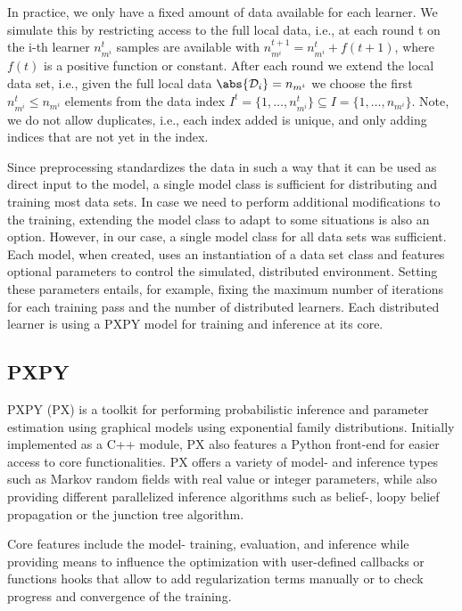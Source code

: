 In practice, we only have a fixed amount of data available for each learner.
We simulate this by restricting access to the full local data, i.e., at each round t on the i-th learner  $n^{t}_{m^i}$ samples are available with $n^{t+1}_{m^i} = n^{t}_{m^i} + f(t+1)$, where $f(t)$ is a positive function or constant.
After each round we extend the local data set, i.e., given the full local data $\abs{\mathcal{D}_i} = n_{m^i}$  we choose the first  $ n^{t}_{m^i} \leq n_{m^i}$ elements from the data index $I^t =\{1, \ldots, n^{t}_{m^i}\} \subseteq I = \{1, \ldots, n_{m^i}\}$. 
Note, we do not allow duplicates, i.e., each index added is unique, and only adding indices that are not yet in the index.



Since preprocessing standardizes the data in such a way that it can be used as direct input to the model, a single model class is sufficient for distributing and training most data sets.
In case we need to perform additional modifications to the training, extending the model class to adapt to some situations is also an option.
However, in our case, a single model class for all data sets was sufficient.
Each model, when created, uses an instantiation of a data set class and features optional parameters to control the simulated, distributed environment. 
Setting these parameters entails, for example, fixing the maximum number of iterations for each training pass and the number of distributed learners.
Each distributed learner is using a PXPY model for training and inference at its core.

\subsection{PXPY}
PXPY\cite{piatkowski2018exponential} (PX) is a toolkit for performing probabilistic inference and parameter estimation using graphical models using exponential family distributions.
Initially implemented as a C++ module, PX also features a Python front-end for easier access to core functionalities.
PX offers a variety of model- and inference types such as Markov random fields with real value or integer parameters, while also providing different parallelized inference algorithms such as belief-, loopy belief propagation or the junction tree algorithm.

Core features include the model- training, evaluation, and inference while providing means to influence the optimization with user-defined callbacks or functions hooks that allow to add regularization terms manually or to check progress and convergence of the training.

